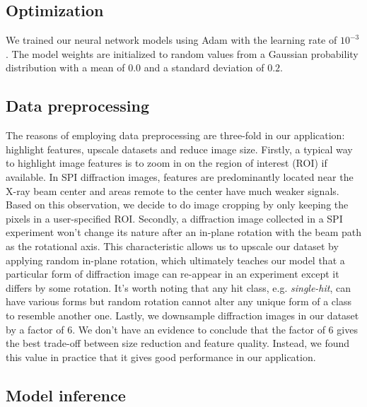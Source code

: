 \subsection{Optimization}


We trained our neural network models using Adam
\cite{kingmaAdamMethodStochastic2017} with the learning rate of $10^{-3}$.  The
model weights are initialized to random values from a Gaussian probability
distribution with a mean of $0.0$ and a standard deviation of $0.2$.  

\subsection{Data preprocessing}

The reasons of employing data preprocessing are three-fold in our application:
highlight features, upscale datasets and reduce image size.  Firstly, a typical
way to highlight image features is to zoom in on the region of interest (ROI) if
available.  In SPI diffraction images, features are predominantly located near
the X-ray beam center and areas remote to the center have much weaker signals.
Based on this observation, we decide to do image cropping by only keeping the
pixels in a user-specified ROI.  Secondly, a diffraction image collected in a
SPI experiment won't change its nature after an in-plane rotation with the beam
path as the rotational axis.  This characteristic allows us to upscale our
dataset by applying random in-plane rotation, which ultimately teaches our model
that a particular form of diffraction image can re-appear in an experiment
except it differs by some rotation.  It's worth noting that any hit class, e.g.
\textit{single-hit}, can have various forms but random rotation cannot alter any
unique form of a class to resemble another one.  Lastly, we downsample
diffraction images in our dataset by a factor of 6.  We don't have an evidence
to conclude that the factor of 6 gives the best trade-off between size reduction
and feature quality.  Instead, we found this value in practice that it gives
good performance in our application.  


\subsection{Model inference}

